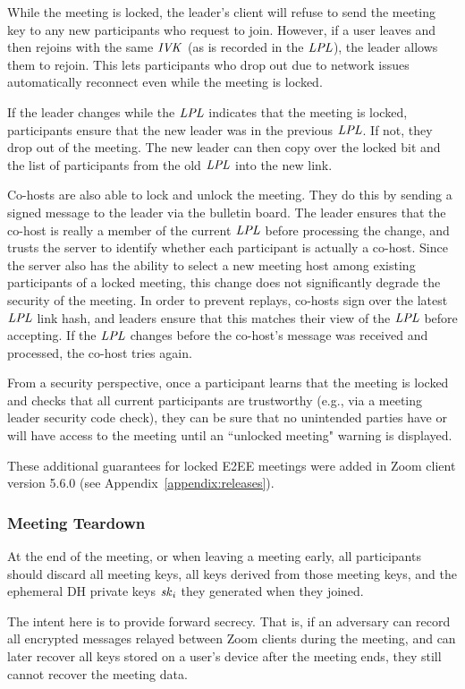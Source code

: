 While the meeting is locked, the leader's client will refuse to send the meeting key to any new
participants who request to join. However, if a user leaves and then rejoins with the same $\mathit{IVK}$
(as is recorded in the $\mathit{LPL}$), the leader allows them to rejoin. This lets participants who drop
out due to network issues automatically reconnect even while the meeting is locked. 

If the leader changes while the $\mathit{LPL}$ indicates that the meeting is locked, participants ensure
that the new leader was in the previous $\mathit{LPL}$. If not, they drop out of the meeting. The new leader
can then copy over the locked bit and the list of participants from the old $\mathit{LPL}$ into the new
link.

Co-hosts are also able to lock and unlock the meeting. They do this by sending a signed message to
the leader via the bulletin board. The leader ensures that the co-host is really a member of the
current $\mathit{LPL}$ before processing the change, and trusts the server to identify whether each
participant is actually a co-host. Since the server also has the ability to select a new meeting
host among existing participants of a locked meeting, this change does not significantly degrade the
security of the meeting. In order to prevent replays, co-hosts sign over the latest $\mathit{LPL}$ link
hash, and leaders ensure that this matches their view of the $\mathit{LPL}$ before accepting. If the $\mathit{LPL}$
changes before the co-host's message was received and processed, the co-host tries again.

From a security perspective, once a participant learns that the meeting is locked and checks that
all current participants are trustworthy (e.g., via a meeting leader security code check), they can
be sure that no unintended parties have or will have access to the meeting until an ``unlocked
meeting" warning is displayed. 

These additional guarantees for locked E2EE meetings were added in Zoom client version 5.6.0 (see
Appendix~\ref{appendix:releases}).

\subsubsection{Meeting Teardown}
At the end of the meeting, or when leaving a meeting early, all participants should discard all
meeting keys, all keys derived from those meeting keys, and the ephemeral DH private keys $\mathit{sk}_i$
they generated when they joined.

The intent here is to provide forward secrecy. That is, if an adversary can record all encrypted
messages relayed between Zoom clients during the meeting, and can later recover all keys stored on a
user's device after the meeting ends, they still cannot recover the meeting data.

